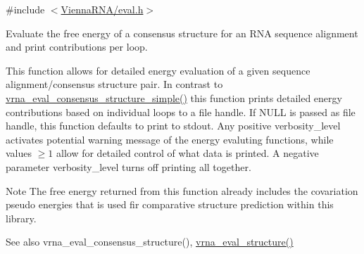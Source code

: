 {\ttfamily \#include $<$\hyperlink{eval_8h}{Vienna\+R\+N\+A/eval.\+h}$>$}



Evaluate the free energy of a consensus structure for an R\+NA sequence alignment and print contributions per loop. 

This function allows for detailed energy evaluation of a given sequence alignment/consensus structure pair. In contrast to \hyperlink{group__eval_ga7762c3a7bdcbc3a14ef93259d322c7d6}{vrna\+\_\+eval\+\_\+consensus\+\_\+structure\+\_\+simple()} this function prints detailed energy contributions based on individual loops to a file handle. If N\+U\+LL is passed as file handle, this function defaults to print to stdout. Any positive {\ttfamily verbosity\+\_\+level} activates potential warning message of the energy evaluting functions, while values $ \ge 1 $ allow for detailed control of what data is printed. A negative parameter {\ttfamily verbosity\+\_\+level} turns off printing all together.

\begin{DoxyNote}{Note}
The free energy returned from this function already includes the covariation pseudo energies that is used fir comparative structure prediction within this library.
\end{DoxyNote}
\begin{DoxySeeAlso}{See also}
vrna\+\_\+eval\+\_\+consensus\+\_\+structure(), \hyperlink{group__eval_ga58f199f1438d794a265f3b27fc8ea631}{vrna\+\_\+eval\+\_\+structure()}
\end{DoxySeeAlso}

